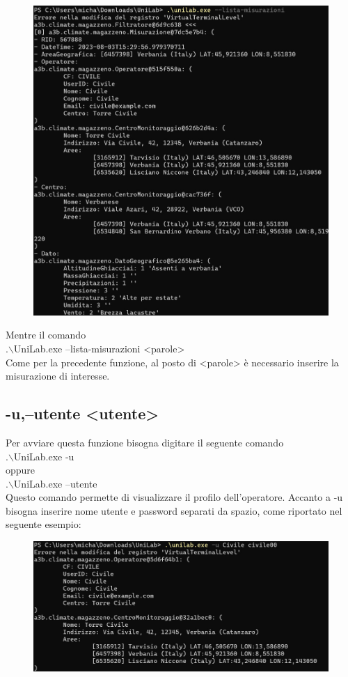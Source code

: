 \documentclass[12pt]{scrreprt}
\begin{document}
		\begin{figure}[H]
			\centering
			\includegraphics[width=0.9\linewidth]{Screen/listamisurazioni}
			\caption[Schermata principale]{}
			\label{fig:listamisurazioni}
		\end{figure}
		
		Mentre il comando
		\\.$\backslash$UniLab.exe --lista-misurazioni <parole>\\
		Come per la precedente funzione, al posto di <parole>  è necessario inserire la misurazione di interesse.
		
		\subsection{-u,--utente <utente>}
		Per avviare questa funzione bisogna digitare il seguente comando
		\\.$\backslash$UniLab.exe -u \\
		oppure
		\\.$\backslash$UniLab.exe --utente \\
		Questo comando permette di visualizzare il profilo dell'operatore.
		Accanto a -u bisogna inserire nome utente e password separati da spazio, come riportato nel seguente esempio:
		
		\begin{figure}[H]
			\centering
			\includegraphics[width=0.9\linewidth]{Screen/utente}
			\caption[Schermata principale]{}
			\label{fig:utente}
		\end{figure}
		
\end{document}
